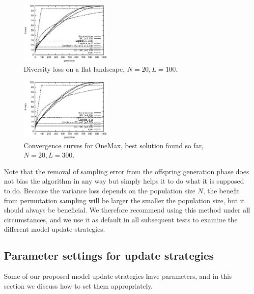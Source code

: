 \documentclass{acm_proc_article-sp}
\newcommand{\Np}{N}
\begin{document}

\begin{figure}
\centerline{
\includegraphics[width=0.4\textwidth]{graph_leading1169910391/graph_leading000_fitness.eps}}
\caption{Diversity loss on a flat landscape, $\Np=20, L=100$.\label{fig:ed}}
\end{figure}
\begin{figure}
\centerline{
\includegraphics[width=0.4\textwidth]{graph_leading1169910391/graph_leading000_fitness.eps}}
\caption{Convergence curves for OneMax, best solution found so far, $\Np=20, L=300$.\label{fig:edOne}}
\end{figure}

Note that the removal of sampling error from the offspring generation phase
does not bias the algorithm in any way but simply helps it to do what
it is supposed to do. 
Because the variance loss depends on the population size $\Np$, the benefit from
permutation sampling will be larger the smaller the population size, but it should
always be beneficial.
We therefore recommend using this method under all circumstances,
and we use it as default in all subsequent tests to examine the different
model update strategies.

\subsection{Parameter settings for update strategies}
\label{sec:parameters}

Some of our proposed model update strategies have parameters, and in this section we
discuss how to set them appropriately.
\end{document}
